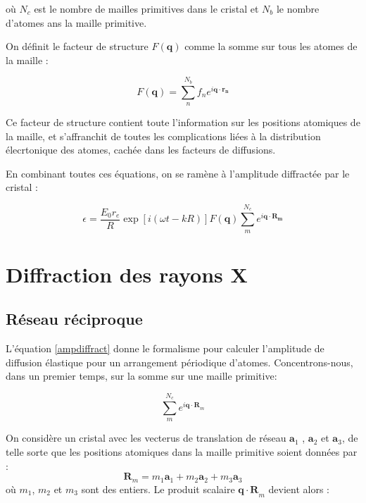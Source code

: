 où $N_c$ est le nombre de mailles primitives dans le cristal et $N_b$ le nombre
d'atomes ans la maille primitive.

On définit le facteur de structure $F(\mathbf{q})$ comme la somme sur tous les
atomes de la maille :

\begin{equation}
    F(\mathbf{q}) = \sum_n^{N_b} f_n e^{i \mathbf{q \cdot r_n}}
\end{equation}

Ce facteur de structure contient toute l'information sur les positions atomiques
de la maille, et s'affranchit de toutes les complications liées à la distribution
élecrtonique des atomes, cachée dans les facteurs de diffusions.

En combinant toutes ces équations, on se ramène à l'amplitude diffractée par le
cristal :

\begin{equation}
    \epsilon = \frac{E_0 r_e}{R} \exp[i(\omega t - k R)] F(\mathbf{q}) \sum_m^{N_c} e^{i\mathbf{q\cdot R_m}}
    \label{ampdiffract}
\end{equation}

\section{Diffraction des rayons X}

\subsection{Réseau réciproque}

L'équation \ref{ampdiffract} donne le formalisme pour calculer l'amplitude de
diffusion élastique pour un arrangement périodique d'atomes. Concentrons-nous,
dans un premier temps, sur la somme sur une maille primitive:

\begin{equation}
    \sum_m^{N_c} e^{i\mathbf{q\cdot R}_m}
\end{equation}

On considère un cristal avec les vecterus de translation de réseau $\mathbf{a}_1$
, $\mathbf{a}_2$ et $\mathbf{a}_3$, de telle sorte que les positions atomiques
dans la maille primitive soient données par :
\begin{equation}
    \mathbf{R}_m = m_1 \mathbf{a}_1 + m_2 \mathbf{a}_2 + m_3 \mathbf{a}_3
\end{equation}
où $m_1$, $m_2$ et $m_3$ sont des entiers. Le produit scalaire 
$\mathbf{q\cdot R}_m$ devient alors :

